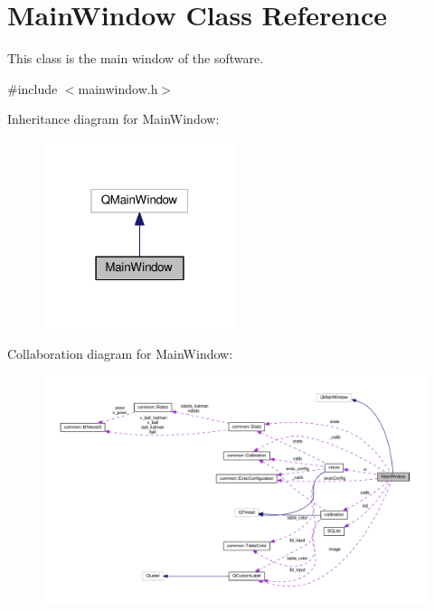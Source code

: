 \hypertarget{classMainWindow}{\section{Main\-Window Class Reference}
\label{classMainWindow}
}


This class is the main window of the software.  




{\ttfamily \#include $<$mainwindow.\-h$>$}



Inheritance diagram for Main\-Window\-:
\nopagebreak
\begin{figure}[H]
\begin{center}
\leavevmode
\includegraphics[width=160pt]{classMainWindow__inherit__graph}
\end{center}
\end{figure}


Collaboration diagram for Main\-Window\-:
\nopagebreak
\begin{figure}[H]
\begin{center}
\leavevmode
\includegraphics[width=350pt]{classMainWindow__coll__graph}
\end{center}
\end{figure}
